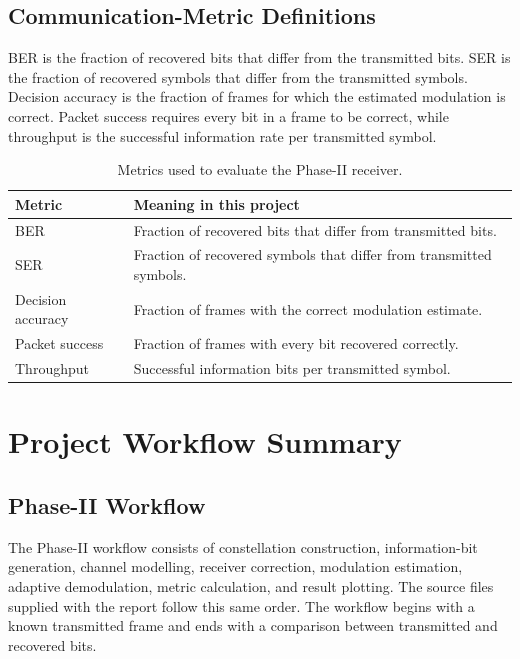 \documentclass[12pt,twoside,openright]{report}
\begin{document}
\section{Communication-Metric Definitions}
BER is the fraction of recovered bits that differ from the transmitted bits.
SER is the fraction of recovered symbols that differ from the transmitted
symbols. Decision accuracy is the fraction of frames for which the estimated
modulation is correct. Packet success requires every bit in a frame to be
correct, while throughput is the successful information rate per transmitted
symbol.

\begin{table}[htbp]
\centering
\small
\caption{Metrics used to evaluate the Phase-II receiver.}
\label{tab:appendixmetrics}
\begin{tabular}{p{} p{}}
\toprule
\textbf{Metric} & \textbf{Meaning in this project}\\
\midrule
BER & Fraction of recovered bits that differ from transmitted bits.\\
SER & Fraction of recovered symbols that differ from transmitted symbols.\\
Decision accuracy & Fraction of frames with the correct modulation estimate.\\
Packet success & Fraction of frames with every bit recovered correctly.\\
Throughput & Successful information bits per transmitted symbol.\\
\bottomrule
\end{tabular}
\end{table}

\chapter{Project Workflow Summary}

\section{Phase-II Workflow}
The Phase-II workflow consists of constellation construction, information-bit
generation, channel modelling, receiver correction, modulation estimation,
adaptive demodulation, metric calculation, and result plotting. The source
files supplied with the report follow this same order. The workflow begins
with a known transmitted frame and ends with a comparison between transmitted
and recovered bits.
\end{document}
